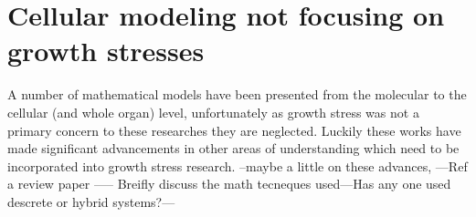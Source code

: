 \section{Cellular modeling not focusing on growth stresses}
A number of mathematical models have been presented from the
molecular to the cellular (and whole organ) level, unfortunately as
growth stress was not a primary concern to these researches they are neglected.
Luckily these works have made significant advancements in other areas of
understanding which need to be incorporated into growth stress research. --maybe
a little on these advances, ---Ref a review paper \cite{ISI:000261731700022} ----- Breifly discuss the math
tecneques used---Has any one used descrete or hybrid systems?---
